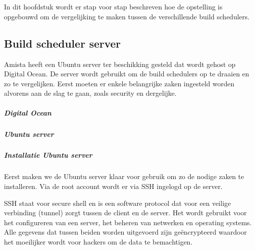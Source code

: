 
\chapter{}
\label{ch:voorbeeldapplicatie}
In dit hoofdstuk wordt er stap voor stap beschreven hoe de opstelling is opgebouwd om de vergelijking te maken tussen de verschillende build schedulers.

    \section{Build scheduler server}
    \label{sec:build-scheduler-server}
    Amista heeft een Ubuntu server ter beschikking gesteld dat wordt gehost op Digital Ocean. De server wordt gebruikt om de build schedulers op te draaien en zo te vergelijken. Eerst moeten er enkele belangrijke zaken ingesteld worden alvorens aan de slag te gaan, zoals security en dergelijke.
    
        \paragraph{Digital Ocean}
        
        \paragraph{Ubuntu server}
        
        \paragraph{Installatie Ubuntu server}
        Eerst maken we de Ubuntu server klaar voor gebruik om zo de nodige zaken te installeren.
        Via de root account wordt er via SSH ingelogd op de server. 
        
        SSH staat voor secure shell en is een software protocol dat voor een veilige verbinding (tunnel) zorgt tussen de client en de server. Het wordt gebruikt voor het configureren van een server, het beheren van netwerken en operating systems. Alle gegevens dat tussen beiden worden uitgevoerd zijn geëncrypteerd waardoor het moeilijker wordt voor hackers om de data te bemachtigen.
        
